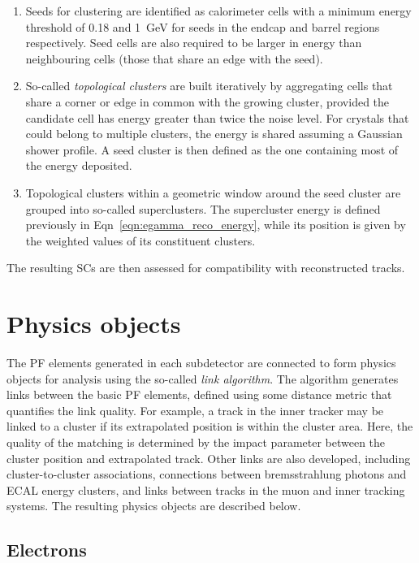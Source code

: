 \begin{enumerate}
    \item Seeds for clustering are identified as calorimeter cells with a minimum energy threshold of 0.18 and 1~GeV for seeds in the endcap and barrel regions respectively. Seed cells are also required to be larger in energy than neighbouring cells (those that share an edge with the seed).
    \item So-called \textit{topological clusters} are built iteratively by aggregating cells that share a corner or edge in common with the growing cluster, provided the candidate cell has energy greater than twice the noise level. For crystals that could belong to multiple clusters, the energy is shared assuming a Gaussian shower profile. A seed cluster is then defined as the one containing most of the energy deposited.
    \item Topological clusters within a geometric window around the seed cluster are grouped into so-called superclusters. The supercluster energy is defined previously in Eqn~\ref{eqn:egamma_reco_energy}, while its position is given by the \pt weighted values of its constituent clusters. 
\end{enumerate}

\noindent The resulting SCs are then assessed for compatibility with reconstructed tracks.


\section{Physics objects}


The PF elements generated in each subdetector are connected to form physics objects for analysis using the so-called \textit{link algorithm}. The algorithm generates links between the basic PF elements, defined using some distance metric that quantifies the link quality. For example, a track in the inner tracker may be linked to a cluster if its extrapolated position is within the cluster area. Here, the quality of the matching is determined by the impact parameter between the cluster position and extrapolated track. Other links are also developed, including cluster-to-cluster associations, connections between bremsstrahlung photons and ECAL energy clusters, and links between tracks in the muon and inner tracking systems. The resulting physics objects are described below. %

\subsection{Electrons}
\label{subsec:elec_reco}

